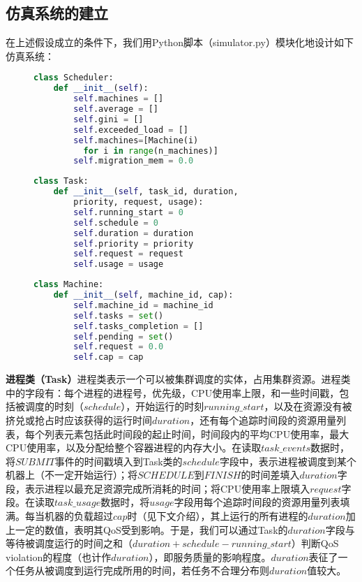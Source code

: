\subsection{仿真系统的建立}
在上述假设成立的条件下，我们用Python脚本（simulator.py）模块化地设计如下仿真系统：
\begin{figure}
\centering
\begin{minipage}[c]{0.55\textwidth}
\begin{lstlisting}[language=python]
class Scheduler:
    def __init__(self):
        self.machines = []
        self.average = []
        self.gini = []
        self.exceeded_load = []
        self.machines=[Machine(i) 
          for i in range(n_machines)]
        self.migration_mem = 0.0
\end{lstlisting}
\end{minipage}
\begin{minipage}[c]{0.55\textwidth}
\begin{lstlisting}[language=python]
class Task:
    def __init__(self, task_id, duration,
        priority, request, usage):
        self.running_start = 0
        self.schedule = 0
        self.duration = duration
        self.priority = priority
        self.request = request
        self.usage = usage
\end{lstlisting}
\end{minipage}
\begin{minipage}[c]{0.55\textwidth}
\begin{lstlisting}[language=python]
class Machine:
    def __init__(self, machine_id, cap):
        self.machine_id = machine_id
        self.tasks = set()
        self.tasks_completion = []
        self.pending = set()
        self.request = 0.0
        self.cap = cap
\end{lstlisting}
\end{minipage}
\end{figure}

\noindent\textbf{进程类（Task）}\quad \label{chap:task}进程类表示一个可以被集群调度的实体，占用集群资源。进程类中的字段有：每个进程的进程号，优先级，CPU使用率上限，和一些时间戳，包括被调度的时刻（$schedule$），开始运行的时刻$running\_start$，以及在资源没有被挤兑或抢占时应该获得的运行时间$duration$，还有每个追踪时间段的资源用量列表，每个列表元素包括此时间段的起止时间，时间段内的平均CPU使用率，最大CPU使用率，以及分配给整个容器进程的内存大小。在读取$task\_events$数据时，将$SUBMIT$事件的时间戳填入到Task类的$schedule$字段中，表示进程被调度到某个机器上（不一定开始运行）；将$SCHEDULE$到$FINISH$的时间差填入$duration$字段，表示进程以最充足资源完成所消耗的时间；将CPU使用率上限填入$request$字段。在读取$task\_usage$数据时，将$usage$字段用每个追踪时间段的资源用量列表填满。每当机器的负载超过$cap$时（见下文介绍），其上运行的所有进程的$duration$加上一定的数值，表明其QoS受到影响。于是，我们可以通过Task的$duration$字段与等待被调度运行的时间之和（$duration + schedule - running\_start$）判断QoS violation的程度（也计作$duration$），即服务质量的影响程度。$duration$表征了一个任务从被调度到运行完成所用的时间，若任务不合理分布则$duration$值较大。

